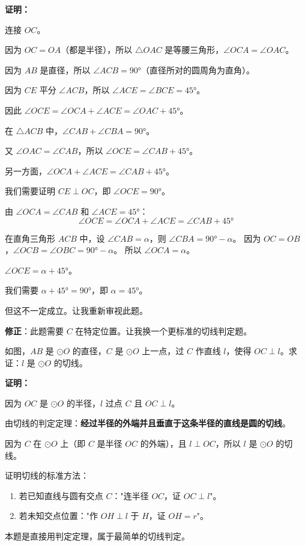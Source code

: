 \documentclass[12pt, a4paper]{ctexart}
\begin{document}
\textbf{证明：}

连接 $OC$。

因为 $OC = OA$（都是半径），所以 $\triangle OAC$ 是等腰三角形，$\angle OCA = \angle OAC$。

因为 $AB$ 是直径，所以 $\angle ACB = 90°$（直径所对的圆周角为直角）。

因为 $CE$ 平分 $\angle ACB$，所以 $\angle ACE = \angle BCE = 45°$。

因此 $\angle OCE = \angle OCA + \angle ACE = \angle OAC + 45°$。

在 $\triangle ACB$ 中，$\angle CAB + \angle CBA = 90°$。

又 $\angle OAC = \angle CAB$，所以 $\angle OCE = \angle CAB + 45°$。

另一方面，$\angle OCA + \angle ACE = \angle CAB + 45°$。

我们需要证明 $CE \perp OC$，即 $\angle OCE = 90°$。

由 $\angle OCA = \angle CAB$ 和 $\angle ACE = 45°$：
\[
\angle OCE = \angle OCA + \angle ACE = \angle CAB + 45°
\]

在直角三角形 $ACB$ 中，设 $\angle CAB = \alpha$，则 $\angle CBA = 90° - \alpha$。
因为 $OC = OB$，$\angle OCB = \angle OBC = 90° - \alpha$。
所以 $\angle OCA = \alpha$。

$\angle OCE = \alpha + 45°$。

我们需要 $\alpha + 45° = 90°$，即 $\alpha = 45°$。

但这不一定成立。让我重新审视此题。

\textbf{修正}：此题需要 $C$ 在特定位置。让我换一个更标准的切线判定题。

\begin{examplebox}
如图，$AB$ 是 $\odot O$ 的直径，$C$ 是 $\odot O$ 上一点，过 $C$ 作直线 $l$，使得 $OC \perp l$。求证：$l$ 是 $\odot O$ 的切线。
\end{examplebox}

\textbf{证明：}

因为 $OC$ 是 $\odot O$ 的半径，$l$ 过点 $C$ 且 $OC \perp l$。

由切线的判定定理：\textbf{经过半径的外端并且垂直于这条半径的直线是圆的切线}。

因为 $C$ 在 $\odot O$ 上（即 $C$ 是半径 $OC$ 的外端），且 $l \perp OC$，所以 $l$ 是 $\odot O$ 的切线。

\begin{tipbox}[方法总结]
证明切线的标准方法：
\begin{enumerate}[nosep]
  \item 若已知直线与圆有交点 $C$："连半径 $OC$，证 $OC \perp l$"。
  \item 若未知交点位置："作 $OH \perp l$ 于 $H$，证 $OH = r$"。
\end{enumerate}
本题是直接用判定定理，属于最简单的切线判定。
\end{tipbox}
\end{document}
